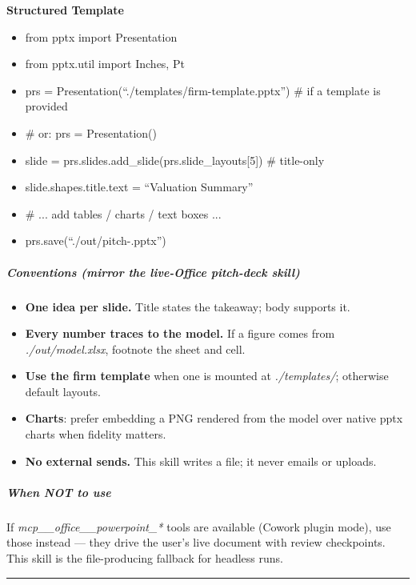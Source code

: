 \documentclass[11pt]{article}
\begin{document}
\textbf{Structured Template}
\begin{itemize}[leftmargin=*,itemsep=2pt,topsep=2pt]
\item {} from pptx import Presentation
\item {} from pptx.util import Inches, Pt
\item {} prs = Presentation(``./templates/firm-template.pptx'') \# if a template is provided
\item {} \# or: prs = Presentation()
\item {} slide = prs.slides.add\_\allowbreak{}slide(prs.slide\_\allowbreak{}layouts[5]) \# title-only
\item {} slide.shapes.title.text = ``Valuation Summary''
\item {} \# ... add tables / charts / text boxes ...
\item {} prs.save(``./out/pitch-.pptx'')
\end{itemize}

\subparagraph{Conventions (mirror the live-Office \emph{pitch-deck} skill)}\mbox{}\par

\begin{itemize}[leftmargin=*,itemsep=2pt,topsep=2pt]
\item {} \textbf{One idea per slide.} Title states the takeaway; body supports it.
\item {} \textbf{Every number traces to the model.} If a figure comes from \emph{./out/model.xlsx}, footnote the sheet and cell.
\item {} \textbf{Use the firm template} when one is mounted at \emph{./templates/}; otherwise default layouts.
\item {} \textbf{Charts}: prefer embedding a PNG rendered from the model over native pptx charts when fidelity matters.
\item {} \textbf{No external sends.} This skill writes a file; it never emails or uploads.
\end{itemize}

\subparagraph{When NOT to use}\mbox{}\par

If \emph{mcp\_\allowbreak{}\_\allowbreak{}office\_\allowbreak{}\_\allowbreak{}powerpoint\_\allowbreak{}*} tools are available (Cowork plugin mode), use those instead — they drive the user's live document with review checkpoints. This skill is the file-producing fallback for headless runs.


\vspace{0.8em}\hrule\vspace{0.8em}
\end{document}
